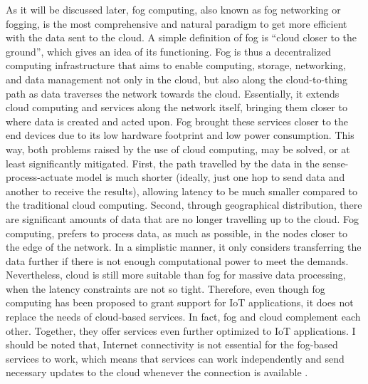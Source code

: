 \noindent\tab As it will be discussed later, fog computing, also known as fog networking or fogging, is the most comprehensive and natural paradigm to get more efficient with the data sent to the cloud. A simple definition of fog is ``cloud closer to the ground'', which gives an idea of its functioning. Fog is thus a decentralized computing infrastructure that aims to enable computing, storage, networking, and data management not only in the cloud, but also along the cloud-to-thing path as data traverses the network towards the cloud. Essentially, it extends cloud computing and services along the network itself, bringing them closer to where data is created and acted upon. Fog brought these services closer to the end devices due to its low hardware footprint and low power consumption. This way, both problems raised by the use of cloud computing, may be solved, or at least significantly mitigated. First, the path travelled by the data in the sense-process-actuate model is much shorter (ideally, just one hop to send data and another to receive the results), allowing latency to be much smaller compared to the traditional cloud computing. Second, through geographical distribution, there are significant amounts of data that are no longer travelling up to the cloud. Fog computing, prefers to process data, as much as possible, in the nodes closer to the edge of the network. In a simplistic manner, it only considers transferring the data further if there is not enough computational power to meet the demands.\\
\noindent\tab Nevertheless, cloud is still more suitable than fog for massive data processing, when the latency constraints are not so tight. Therefore, even though fog computing has been proposed to grant support for IoT applications, it does not replace the needs of cloud-based services. In fact, fog and cloud complement each other. Together, they offer services even further optimized to IoT applications. I should be noted that, Internet connectivity is not essential for the fog-based services to work, which means that services can work independently and send necessary updates to the cloud whenever the connection is available \cite{yousefpour2018all}.\\
